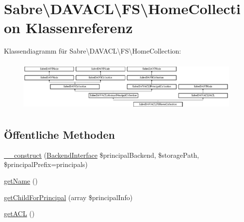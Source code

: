 \hypertarget{class_sabre_1_1_d_a_v_a_c_l_1_1_f_s_1_1_home_collection}{}\section{Sabre\textbackslash{}D\+A\+V\+A\+CL\textbackslash{}FS\textbackslash{}Home\+Collection Klassenreferenz}
\label{class_sabre_1_1_d_a_v_a_c_l_1_1_f_s_1_1_home_collection}
Klassendiagramm für Sabre\textbackslash{}D\+A\+V\+A\+CL\textbackslash{}FS\textbackslash{}Home\+Collection\+:\begin{figure}[H]
\begin{center}
\leavevmode
\includegraphics[height=2.621723cm]{class_sabre_1_1_d_a_v_a_c_l_1_1_f_s_1_1_home_collection}
\end{center}
\end{figure}
\subsection*{Öffentliche Methoden}
\begin{DoxyCompactItemize}
\item 
\mbox{\hyperlink{class_sabre_1_1_d_a_v_a_c_l_1_1_f_s_1_1_home_collection_a247ea82e5b929d9ec808b5c08ec284ca}{\+\_\+\+\_\+construct}} (\mbox{\hyperlink{interface_sabre_1_1_d_a_v_a_c_l_1_1_principal_backend_1_1_backend_interface}{Backend\+Interface}} \$principal\+Backend, \$storage\+Path, \$principal\+Prefix=\textquotesingle{}principals\textquotesingle{})
\item 
\mbox{\hyperlink{class_sabre_1_1_d_a_v_a_c_l_1_1_f_s_1_1_home_collection_aeecd8557ff4548558c0cbe1e2aca45bf}{get\+Name}} ()
\item 
\mbox{\hyperlink{class_sabre_1_1_d_a_v_a_c_l_1_1_f_s_1_1_home_collection_ac336410af0388b8642713396d6a98eb5}{get\+Child\+For\+Principal}} (array \$principal\+Info)
\item 
\mbox{\hyperlink{class_sabre_1_1_d_a_v_a_c_l_1_1_f_s_1_1_home_collection_a20aa5b9fe8e871143f0b616fd7bedfe5}{get\+A\+CL}} ()
\end{DoxyCompactItemize}

